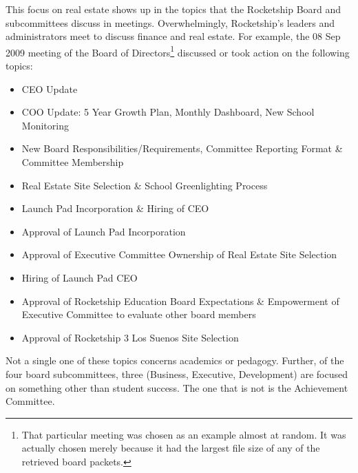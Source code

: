 This focus on real estate shows up in the topics that the Rocketship Board and subcommittees discuss in meetings. Overwhelmingly, Rocketship's leaders and administrators meet to discuss finance and real estate. For example, the 08 Sep 2009 meeting of the Board of Directors\footnote{That particular meeting was chosen as an example almost at random. It was actually chosen merely because it had the largest file size of any of the retrieved board packets.} discussed or took action on the following topics:
\begin{itemize}
  \item CEO Update
  \item COO Update: 5 Year Growth Plan, Monthly Dashboard, New School Monitoring
  \item New Board Responsibilities/Requirements, Committee Reporting Format \& Committee Membership
  \item Real Estate Site Selection \& School Greenlighting Process
  \item Launch Pad Incorporation \& Hiring of CEO
  \item Approval of Launch Pad Incorporation
  \item Approval of Executive Committee Ownership of Real Estate Site Selection
  \item Hiring of Launch Pad CEO
  \item Approval of Rocketship Education Board Expectations \& Empowerment of Executive Committee to evaluate other board members
  \item Approval of Rocketship 3 Los Suenos Site Selection
\end{itemize}
Not a single one of these topics concerns academics or pedagogy. Further, of the four board subcommittees, three (Business, Executive, Development) are focused on something other than student success. The one that is not is the Achievement Committee.

